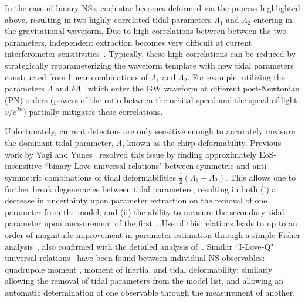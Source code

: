 \documentclass[prd,twocolumn,nofootinbib,superscriptaddress,amsmath,amssymb]{revtex4-1}
\begin{document}
In the case of binary NSs, each star becomes deformed via the process highlighted above, resulting in two highly correlated tidal parameters $\Lambda_1$ and $\Lambda_2$ entering in the gravitational waveform\cite{Flanagan2008,Vines:2011ud}.
Due to high correlations between between the two parameters, independent extraction becomes very difficult at current interferometer sensitivities~\cite{Wade:tidalCorrections}.
Typically, these high correlations can be reduced by strategically reparameterizing the waveform template with new tidal parameters constructed from linear combinations of $\Lambda_1$ and $\Lambda_2$.
For example, utilizing the parameters $\tilde{\Lambda}$ and $\delta \tilde{\Lambda}$~\cite{Favata:2013rwa,Wade:tidalCorrections} which enter the GW waveform at different post-Newtonian (PN) orders (powers of the ratio between the orbital speed and the speed of light $v/c^{2n}$) partially mitigates these correlations.

Unfortunately, current detectors are only sensitive enough to accurately measure the dominant tidal parameter, $\tilde{\Lambda}$, known as the chirp deformability.
Previous work by Yagi and Yunes~\cite{Yagi:binLove} resolved this issue by finding approximately EoS-insensitive ``binary Love universal relations" between symmetric and anti-symmetric combinations of tidal deformabilities $\frac{1}{2}(\Lambda_1 \pm \Lambda_2)$.
This allows one to further break degeneracies between tidal parameters, resulting in both (i) a decrease in uncertainty upon parameter extraction on the removal of one parameter from the model, and (ii) the ability to measure the secondary tidal parameter upon measurement of the first~\cite{Katerina:residuals}.  
Use of this relations leads to up to an order of magnitude improvement in parameter estimation  through a simple Fisher analysis~\cite{Yagi:binLove}, also confirmed with the detailed analysis of~\cite{Katerina:residuals}.
Similar ``I-Love-Q" universal relations~\cite{Yagi:ILQ} have been found between individual NS observables: quadrupole moment , moment of inertia, and tidal deformability; similarly allowing the removal of tidal parameters from the model list, and allowing an automatic determination of one observable through the measurement of another.
\end{document}
